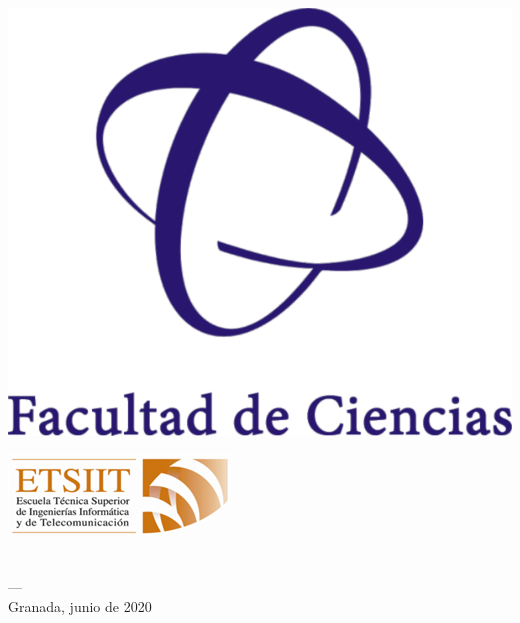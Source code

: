 \begin{titlepage}
\begin{minipage}{\textwidth}
		\begin{minipage}[btr]{0.25\textwidth}
			\centering
			\includegraphics[width=\textwidth]{imagenes/ciencias_logo.png}
		\end{minipage}
		\hspace{1cm}
		\begin{minipage}[btl]{0.3\textwidth}
			\centering
			\includegraphics[width=\textwidth]{imagenes/etsiit_logo.png}
		\end{minipage}\\
		\vspace{1cm} 
		\textsc{---}\\
		Granada, junio de 2020
	\end{minipage}
\end{titlepage}



